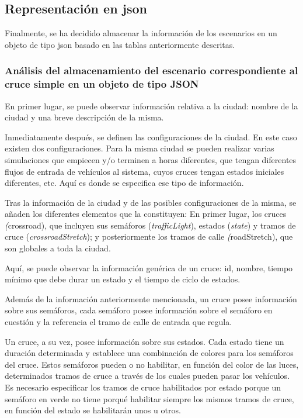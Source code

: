 \subsection{Representación en \acrshort{json}}
Finalmente, se ha decidido almacenar la información de los escenarios en un objeto de tipo \acrshort{json} basado en las tablas anteriormente descritas. 

\subsubsection{Análisis del almacenamiento del escenario correspondiente al cruce simple en un objeto de tipo JSON}
En primer lugar, se puede observar información relativa a la ciudad: nombre de la ciudad y una breve descripción de la misma.


Inmediatamente después, se definen las configuraciones de la ciudad. En este caso existen dos configuraciones. 
Para la misma ciudad se pueden realizar varias simulaciones que empiecen y/o terminen a horas diferentes, que tengan diferentes flujos de entrada de vehículos al sistema, cuyos cruces tengan estados iniciales diferentes, etc. Aquí es donde se especifica ese tipo de información.


Tras la información de la ciudad y de las posibles configuraciones de la misma, se añaden los diferentes elementos que la constituyen: En primer lugar, los cruces \textit({crossroad}), que incluyen sus semáforos (\textit{trafficLight}), estados (\textit{state}) y tramos de cruce (\textit{crossroadStretch}); y posteriormente los tramos de calle \textit({roadStretch}), que son globales a toda la ciudad.

Aquí, se puede observar la información genérica de un cruce: id, nombre, tiempo mínimo que debe durar un estado y el tiempo de ciclo de estados.


Además de la información anteriormente mencionada, un cruce posee información sobre sus semáforos, cada semáforo posee información sobre el semáforo en cuestión y la referencia el tramo de calle de entrada que regula.


Un cruce, a su vez, posee información sobre sus estados. Cada estado tiene un duración determinada y establece una combinación de colores para los semáforos del cruce. Estos semáforos pueden o no habilitar, en función del color de las luces, determinados tramos de cruce a través de los cuales pueden pasar los vehículos. Es necesario especificar los tramos de cruce habilitados por estado porque un semáforo en verde no tiene porqué habilitar siempre los mismos tramos de cruce, en función del estado se habilitarán unos u otros.


